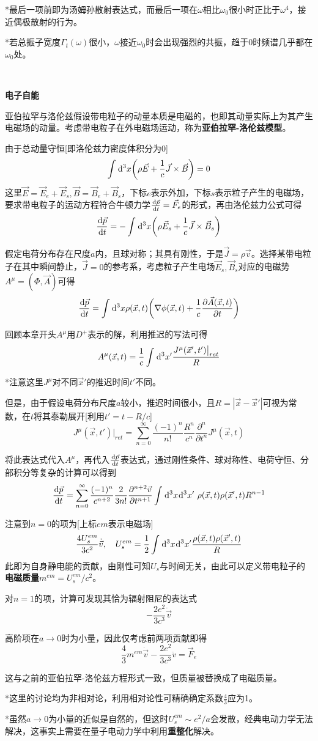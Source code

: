 \documentclass[a4paper,UTF8,fontset=windows]{ctexart}
\newcommand*{\dr}{\hspace{0.07em}\mathrm{d}}
\newcommand*{\va}{\vec{A}}
\newcommand*{\vb}{\vec{B}}
\newcommand*{\ve}{\vec{E}}
\newcommand*{\vf}{\vec{F}}
\newcommand*{\vj}{\vec{J}}
\newcommand*{\vps}{\vec{p}}
\newcommand*{\vvs}{\vec{v}}
\newcommand*{\vx}{\vec{x}}
\newcommand*{\dt}[2][t]{\frac{\dr #2}{\dr #1}}
\newcommand*{\pt}[2][t]{\frac{\partial #2}{\partial #1}}
\begin{document}
*最后一项前即为汤姆孙散射表达式，而最后一项在$\omega$相比$\omega_0$很小时正比于$\omega^4$，接近偶极散射的行为。

*若总振子宽度$\Gamma_t(\omega)$很小，$\omega$接近$\omega_0$时会出现强烈的共振，趋于0时频谱几乎都在$\omega_0$处。

\

\textbf{电子自能}

亚伯拉罕与洛伦兹假设带电粒子的动量本质是电磁的，也即其动量实际上为其产生电磁场的动量。考虑带电粒子在外电磁场运动，称为\textbf{亚伯拉罕-洛伦兹模型}。

由于总动量守恒[即洛伦兹力密度体积分为0]
$$\int\dr^3x\bigg(\rho\ve+\frac{1}{c}\vj\times\vb\bigg)=0$$
这里$\ve=\ve_e+\ve_s,\vb=\vb_e+\vb_s$，下标$e$表示外加，下标$s$表示粒子产生的电磁场，要求带电粒子的运动方程符合牛顿力学$\dt{\vps}=\vf_e$的形式，再由洛伦兹力公式可得
$$\dt{\vps}=-\int\dr^3x\bigg(\rho\ve_s+\frac{1}{c}\vj\times\vb_s\bigg)$$

假定电荷分布存在尺度$a$内，且球对称；其具有刚性，于是$\vj=\rho\vvs$。选择某带电粒子在其中瞬间静止，$\vj=0$的参考系，考虑粒子产生电场$\ve_s,\vb_s$对应的电磁势$A^\mu=(\Phi,\va)$可得
$$\dt{\vps}=\int\dr^3x\rho(\vx,t)\bigg(\nabla\phi(\vx,t)+\frac{1}{c}\pt{\va(\vx,t)}\bigg)$$

回顾本章开头$A^\mu$用$D^+$表示的解，利用推迟的写法可得
$$A^\mu(\vx,t)=\frac{1}{c}\int\dr^3x'\frac{J^\mu(\vx',t')\big|_{ret}}{R}$$

*注意这里$J^\mu$对不同$\vx'$的推迟时间$t'$不同。

但是，由于假设电荷分布尺度$a$较小，推迟时间很小，且$R=|\vx-\vx'|$可视为常数，在$t$将其泰勒展开[利用$t'=t-R/c$]
$$J^\mu(\vx,t')\big|_{ret}=\sum_{n=0}^\infty\frac{(-1)^n}{n!}\frac{R^n}{c^n}\pt[t^n]{^n}J^\mu(\vx,t)$$

将此表达式代入$A^\mu$，再代入$\dt{\vps}$表达式，通过刚性条件、球对称性、电荷守恒、分部积分等复杂的计算可以得到
$$\dt{\vps}=\sum_{n=0}^\infty\frac{(-1)^n}{c^{n+2}}\frac{2}{3n!}\pt[t^{n+1}]{^{n+2}\vvs}\int\dr^3x\dr^3x'\ \rho(\vx,t)\rho(\vx',t)R^{n-1}$$

注意到$n=0$的项为[上标$em$表示电磁场]
$$\frac{4U_s^{em}}{3c^2}\dot{\vvs},\quad U_s^{em}=\frac{1}{2}\int\dr^3x\dr^3x'\frac{\rho(\vx,t)\rho(\vx',t)}{R}$$
此即为自身静电能的贡献，由刚性可知$U_s$与时间无关，由此可以定义带电粒子的\textbf{电磁质量}$m^{em}=U_s^{em}/c^2$。

对$n=1$的项，计算可发现其恰为辐射阻尼的表达式
$$-\frac{2e^2}{3c^3}\ddot{\vvs}$$

高阶项在$a\to0$时为小量，因此仅考虑前两项贡献即得
$$\frac{4}{3}m^{em}\dot{\vvs}-\frac{2e^2}{3c^3}\ddot{v}=\vf_e$$

这与之前的亚伯拉罕-洛伦兹方程形式一致，但质量被替换成了电磁质量。

*这里的讨论均为非相对论，利用相对论性可精确确定系数$\frac{4}{3}$应为1。

*虽然$a\to0$为小量的近似是自然的，但这时$U^{em}_s\sim e^2/a$会发散，经典电动力学无法解决，这事实上需要在量子电动力学中利用\textbf{重整化}解决。
\end{document}
